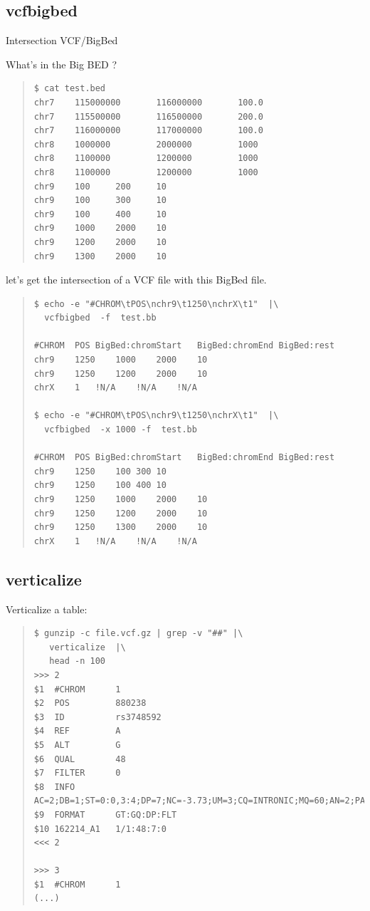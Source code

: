 \documentclass[12pt]{article}
\begin{document}
\subsection{vcfbigbed}
Intersection VCF/BigBed

What's in the Big BED ?
\begin{quote}
\begin{verbatim}
$ cat test.bed 
chr7    115000000       116000000       100.0
chr7    115500000       116500000       200.0
chr7    116000000       117000000       100.0
chr8    1000000         2000000         1000
chr8    1100000         1200000         1000
chr8    1100000         1200000         1000
chr9    100     200     10
chr9    100     300     10
chr9    100     400     10
chr9    1000    2000    10
chr9    1200    2000    10
chr9    1300    2000    10
\end{verbatim}
\end{quote}

let's get the intersection of a VCF file with this BigBed file.

\begin{quote}
\begin{verbatim}
$ echo -e "#CHROM\tPOS\nchr9\t1250\nchrX\t1"  |\
  vcfbigbed  -f  test.bb 

#CHROM	POS	BigBed:chromStart	BigBed:chromEnd	BigBed:rest
chr9	1250	1000	2000	10
chr9	1250	1200	2000	10
chrX	1	!N/A	!N/A	!N/A

$ echo -e "#CHROM\tPOS\nchr9\t1250\nchrX\t1"  |\
  vcfbigbed  -x 1000 -f  test.bb 

#CHROM	POS	BigBed:chromStart	BigBed:chromEnd	BigBed:rest
chr9	1250	100	300	10
chr9	1250	100	400	10
chr9	1250	1000	2000	10
chr9	1250	1200	2000	10
chr9	1250	1300	2000	10
chrX	1	!N/A	!N/A	!N/A

\end{verbatim}
\end{quote}

\subsection{verticalize}
Verticalize a table:
\begin{quote}
\begin{verbatim}
$ gunzip -c file.vcf.gz | grep -v "##" |\
   verticalize  |\
   head -n 100
>>>	2
$1	#CHROM   	1
$2	POS      	880238
$3	ID       	rs3748592
$4	REF      	A
$5	ALT      	G
$6	QUAL     	48
$7	FILTER   	0
$8	INFO     	AC=2;DB=1;ST=0:0,3:4;DP=7;NC=-3.73;UM=3;CQ=INTRONIC;MQ=60;AN=2;PA=1^1:0.930&2^1:0.860&3^1:0.950;MZ=0;GN=NOC2L;PS=1
$9	FORMAT   	GT:GQ:DP:FLT
$10	162214_A1	1/1:48:7:0
<<<	2

>>>	3
$1	#CHROM   	1
(...)
\end{verbatim}
\end{quote}
\end{document}
